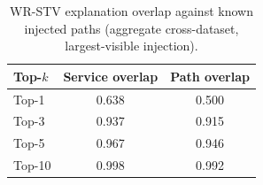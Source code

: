 \begin{table}[t]
\centering
\caption{WR-STV explanation overlap against known injected paths
(aggregate cross-dataset, largest-visible injection).}
\label{tab:explainability}
\begin{tabular}{lcc}
\toprule
\textbf{Top-$k$} & \textbf{Service overlap} & \textbf{Path overlap} \\
\midrule
Top-1  & 0.638 & 0.500 \\
Top-3  & 0.937 & 0.915 \\
Top-5  & 0.967 & 0.946 \\
Top-10 & 0.998 & 0.992 \\
\bottomrule
\end{tabular}
\end{table}
